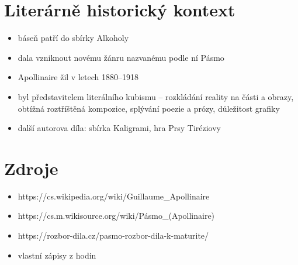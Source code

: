 \documentclass[10pt,a4paper]{article}
\begin{document}
\section*{Literárně historický kontext}
\begin{itemize}
\item báseň patří do sbírky Alkoholy
\item dala vzniknout novému žánru nazvanému podle ní Pásmo
\item Apollinaire žil v letech 1880--1918
\item byl představitelem literálního kubismu -- rozkládání reality na části a obrazy, obtížná roztříštěná kompozice, splývání poezie a prózy, důležitost grafiky
\item další autorova díla: sbírka Kaligrami, hra Prsy Tiréziovy
\end{itemize}
\section*{Zdroje}
\begin{itemize}
\item https://cs.wikipedia.org/wiki/Guillaume\_Apollinaire
\item https://cs.m.wikisource.org/wiki/Pásmo\_(Apollinaire)
\item https://rozbor-dila.cz/pasmo-rozbor-dila-k-maturite/
\item vlastní zápisy z hodin
\end{itemize}
\end{document}
